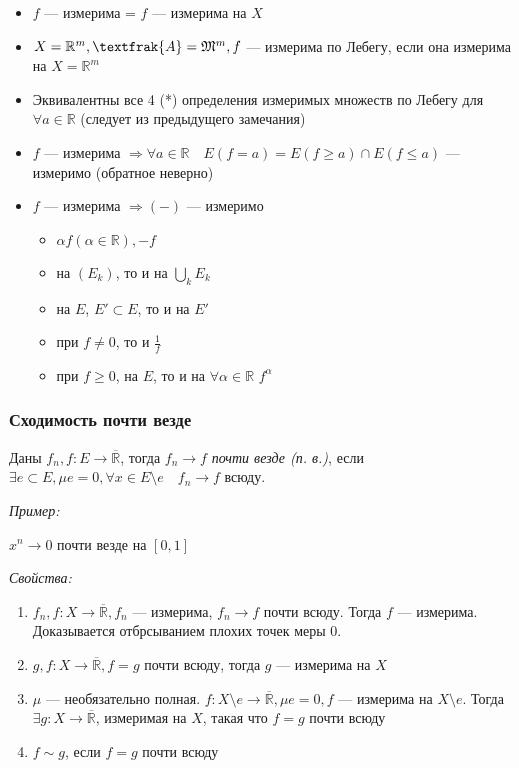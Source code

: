 \documentclass{article}
\def\dbl{\,\,}
\begin{document}
\begin{itemize}
    \item $f$ --- измерима = $f$ --- измерима на $X$
    \item $X = \mathbb{R}^m, \textfrak{A} = \mathfrak{M}^m, f$ --- измерима по Лебегу, если она измерима на $X = \mathbb{R}^m$
    \item Эквивалентны все 4 (*) определения измеримых множеств по Лебегу для $\forall a \in \mathbb{R}$ (следует из предыдущего замечания)
    \item $f$ --- измерима $\Rightarrow \forall a \in \mathbb{R} \quad E(f = a) = E(f \ge a) \cap E(f \le a)$ --- измеримо (обратное неверно)
    \item $f$ --- измерима $\Rightarrow (-)$ --- измеримо   
        \begin{itemize}
            \item $\alpha f (\alpha \in \mathbb{R}), -f$
            \item на $(E_k)$, то и на $\bigcup_{k} E_k$
            \item на $E$, $E' \subset E$, то и на $E'$
            \item при $f \neq 0$, то и $\frac{1}{f}$
            \item при $f \ge 0$, на $E$, то и на $\forall \alpha \in \mathbb{R} \dbl f^{\alpha}$
        \end{itemize}
\end{itemize}


\subsubsection{Сходимость почти везде}

Даны $f_n, f: E \rightarrow \overline{\mathbb{R}}$, тогда $f_n \rightarrow f$ \textit{почти везде (п. в.)}, если $\exists e \subset E, \mu e =0, \forall x \in E \setminus e \quad f_n \rightarrow f$ всюду.

\textit{Пример: }

$x^n \rightarrow 0$ почти везде на $[0, 1]$

\textit{Свойства: }

\begin{enumerate}
    \item $f_n, f: X \rightarrow \overline{\mathbb{R}}, f_n$ --- измерима, $f_n \rightarrow f$ почти всюду. Тогда $f$ --- измерима. Доказывается отбрсыванием плохих точек меры 0.
    \item $g, f: X \rightarrow \overline{\mathbb{R}}, f = g$ почти всюду, тогда $g$ --- измерима на $X$
    \item $\mu$ --- необязательно полная. $f: X \setminus e \rightarrow \overline{\mathbb{R}}, \mu e = 0, f$ --- измерима на $X \setminus e$. Тогда $\exists g: X \rightarrow \overline{\mathbb{R}}$, измеримая на $X$, такая что $f = g$ почти всюду
    \item $f \sim g$, если $f = g$ почти всюду
\end{enumerate}
\end{document}
